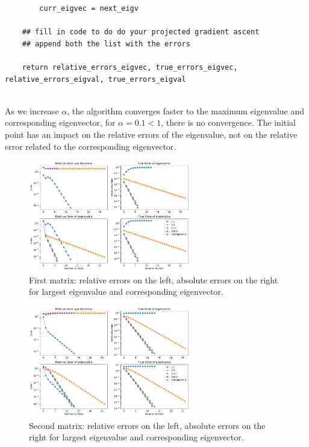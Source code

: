 \documentclass[12pt,twoside]{article}
\begin{document}
\begin{enumerate}
\begin{enumerate}
\begin{verbatim}
        curr_eigvec = next_eigv

    ## fill in code to do do your projected gradient ascent
    ## append both the list with the errors

    return relative_errors_eigvec, true_errors_eigvec, relative_errors_eigval, true_errors_eigval
        
\end{verbatim}
As we increase $\alpha$, the algorithm converges faster to the maximum eigenvalue and corresponding eigenvector, for $\alpha=0.1 < 1$, there is no convergence.
The initial point has an impact on the relative errors of the eigenvalue, not on the relative error related to the corresponding eigenvector.

\begin{figure}[H]
	\centering
	\includegraphics[width=200pt]{figures/random_init_2.pdf}
	\caption{First matrix: relative errors on the left,  absolute errors on the right for largest eigenvalue and corresponding eigenvector.
}	\label{fig1}
\end{figure}

\begin{figure}[H]
	\centering
	\includegraphics[width=200pt]{figures/random_init_3.pdf}
	\caption{Second matrix: relative errors on the left,  absolute errors on the right for largest eigenvalue and corresponding eigenvector.}
	\label{fig1}
\end{figure}


\end{enumerate}
\end{enumerate}
\end{document}
